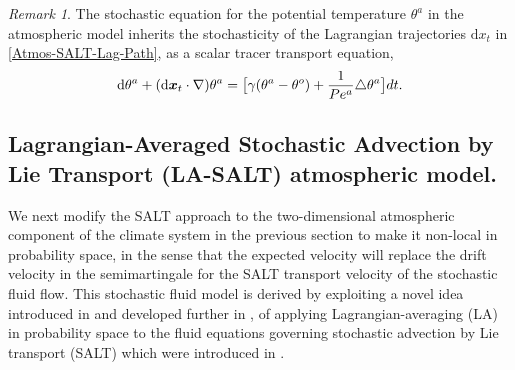 \documentclass[11pt, oneside]{article}   	%
\numberwithin{equation}{section}
\theoremstyle{plain}
\theoremstyle{definition}
\theoremstyle{remark}
\newtheorem{remark}[theorem]{Remark}
\newcommand{\<}{\langle}
\renewcommand{\>}{\rangle}
\def\rmd{{\mathrm{d}}}
\newcommand{\bs}[1]{\boldsymbol{#1}}
\begin{document}
\begin{remark} The stochastic equation for the potential temperature $\theta^a$ in the atmospheric model inherits the stochasticity of the Lagrangian trajectories ${\rmd x_t}$ in \eqref{Atmos-SALT-Lag-Path}, as a scalar tracer transport equation,
\begin{align}
{\rm d}\theta^a 
+ (\rmd\bs{x}_t\cdot\nabla)\theta^a
= 
 \big[ \gamma(\theta^a - \theta^o)
+\frac{1}{Pe^a}\triangle \theta^a\big]dt.
\label{Stoch_THETA_A}
\end{align}
\end{remark}



\subsection{Lagrangian-Averaged Stochastic Advection by Lie Transport (LA-SALT) atmospheric  model.} 

\color{black}
We next modify the SALT approach to the two-dimensional atmospheric component of the climate system in the previous section to make it non-local in probability space, in the sense that the expected velocity will replace the drift velocity in the semimartingale for the SALT transport velocity of the stochastic fluid flow. This stochastic fluid model is derived by exploiting a novel idea introduced in \cite{DrivasHolm2019} and developed further in \cite{alonso2020modelling,DrivasHolmLeahy2020}, of applying Lagrangian-averaging (LA) in probability space to the fluid equations governing stochastic advection by Lie transport (SALT) which were introduced in \cite{Holm2015}.
\end{document}
